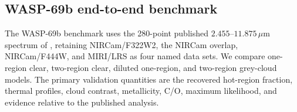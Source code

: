 \subsection{WASP-69b end-to-end benchmark}

The WASP-69b benchmark uses the 280-point published $2.455$--$11.875\,\mu$m
spectrum of \citet{Schlawin2024}, retaining NIRCam/F322W2, the NIRCam overlap,
NIRCam/F444W, and MIRI/LRS as four named data sets. We compare one-region clear,
two-region clear, diluted one-region, and two-region grey-cloud models. The
primary validation quantities are the recovered hot-region fraction, thermal
profiles, cloud contrast, metallicity, C/O, maximum likelihood, and evidence
relative to the published analysis. 
